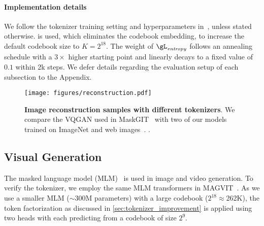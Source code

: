 \paragraph{Implementation details}
We follow the tokenizer training setting and hyperparameters in~\citep{yu2022magvit}, unless stated otherwise. \quantizername{} is used, which eliminates the codebook embedding, to increase the default codebook size to $K=2^{18}$. 
The weight of $\gL_\mathit{entropy}$ follows an annealing schedule with a $3\times$ higher starting point and linearly decays to a fixed value of $0.1$ within 2k steps.
We defer details regarding the evaluation setup of each subsection to the Appendix.

\begin{figure}[tp]
\vspace{-6mm}
    \centering
    \texttt{[image: figures/reconstruction.pdf]}
    \vspace{-4mm}
    \caption{\textbf{Image reconstruction samples with different tokenizers}. We compare the VQGAN used in MaskGIT~\citep{chang2022maskgit} with two of our models trained on ImageNet and web images~\citep{chen2022pali}. .}
    \label{fig:reconstruction}
    \vspace{-4mm}
\end{figure}

\vspace{-2mm}
\subsection{Visual Generation}\label{sec:gen}
\vspace{-2mm}
The masked language model (MLM)~\citep{devlin2019bert} is used in image and video generation. To verify the tokenizer, we employ the same MLM transformers in MAGVIT~\citep{yu2022magvit}. 
As we use a smaller MLM ($\sim$300M parameters) with a large codebook ($2^{18}\approx$262K), the token factorization as discussed in \cref{sec:tokenizer_improvement} is applied using two heads with each predicting from a codebook of size $2^9$.

